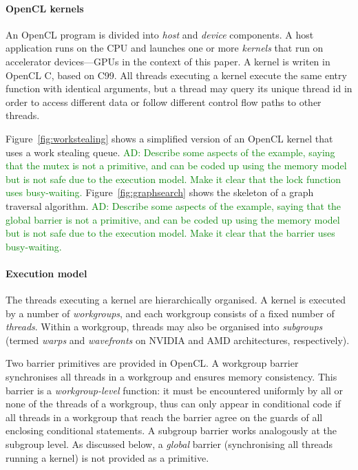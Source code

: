 \documentclass[nocopyrightspace]{sigplanconf-pldi16}
\newcommand{\ADComment}[1]{\textcolor{green}{AD: #1}}
\begin{document}
\paragraph{OpenCL kernels}

An OpenCL program is divided into \emph{host} and \emph{device}
components.  A host application runs on the CPU and launches one or
more \emph{kernels} that run on accelerator devices---GPUs in the
context of this paper.  A kernel is writen in OpenCL C, based on C99.
All threads executing a kernel execute the same entry function with
identical arguments, but a thread may query its unique thread id in
order to access different data or follow different control flow paths
to other threads.

Figure~\ref{fig:workstealing} shows a simplified version of an OpenCL
kernel that uses a work stealing queue.  \ADComment{Describe some
  aspects of the example, saying that the mutex is not a primitive,
  and can be coded up using the memory model but is not safe due to
  the execution model.  Make it clear that the lock function uses busy-waiting.}  Figure~\ref{fig:graphsearch} shows the
skeleton of a graph traversal algorithm.  \ADComment{Describe some
  aspects of the example, saying that the global barrier is not a
  primitive, and can be coded up using the memory model but is not
  safe due to the execution model.  Make it clear that the barrier uses busy-waiting.}

\paragraph{Execution model}

The threads executing a kernel are hierarchically organised.  A kernel
is executed by a number of \emph{workgroups}, and each workgroup
consists of a fixed number of \emph{threads}.  Within a workgroup,
threads may also be organised into \emph{subgroups} (termed
\emph{warps} and \emph{wavefronts} on NVIDIA and AMD architectures,
respectively).

Two barrier primitives are provided in OpenCL.  A workgroup barrier
synchronises all threads in a workgroup and ensures memory
consistency.  This barrier is a \emph{workgroup-level} function: it
must be encountered uniformly by all or none of the threads of a
workgroup, thus can only appear in conditional code if all threads in
a workgroup that reach the barrier agree on the guards of all
enclosing conditional statements.  A subgroup barrier works
analogously at the subgroup level.  As discussed below, a
\emph{global} barrier (synchronising all threads running a kernel) is
not provided as a primitive.
\end{document}
